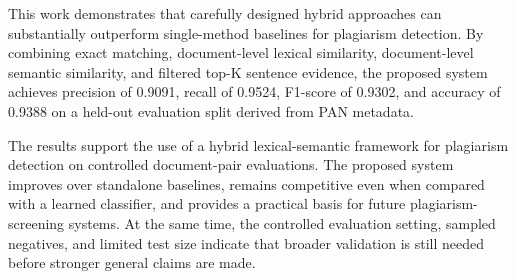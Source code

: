 \documentclass{llncs}
\begin{document}
This work demonstrates that carefully designed hybrid approaches can substantially outperform single-method baselines for plagiarism detection. By combining exact matching, document-level lexical similarity, document-level semantic similarity, and filtered top-K sentence evidence, the proposed system achieves precision of 0.9091, recall of 0.9524, F1-score of 0.9302, and accuracy of 0.9388 on a held-out evaluation split derived from PAN metadata.

The results support the use of a hybrid lexical-semantic framework for plagiarism detection on controlled document-pair evaluations. The proposed system improves over standalone baselines, remains competitive even when compared with a learned classifier, and provides a practical basis for future plagiarism-screening systems. At the same time, the controlled evaluation setting, sampled negatives, and limited test size indicate that broader validation is still needed before stronger general claims are made.
\end{document}
